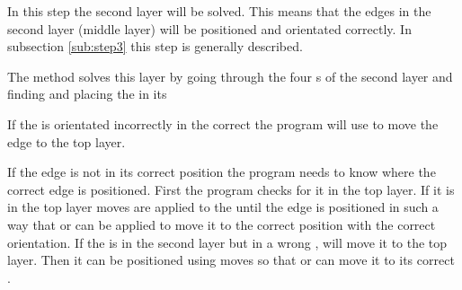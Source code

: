 In this step the second layer will be solved. 
This means that the edges in the second layer (middle layer) will be positioned and orientated correctly. 
In subsection \ref{sub:step3} this step is generally described. 

The method solves this layer by going through the four \cubicle{}s of the second layer and finding and placing the \cpiece{} in its \cubicle{}

If the \cpiece{} is orientated incorrectly in the correct \cubicle{} the program will use   to move the edge \cpiece{} to the top layer.

If the edge \cpiece{} is not in its correct position the program needs to know where the correct edge \cpiece{} is positioned. First the program checks for it in the top layer. 
If it is in the top layer  moves are applied to the \rubik{} until the edge \cpiece{} is positioned in such a way that  or  can be applied to move it to the correct position with the correct orientation. 
If the \cpiece{} is in the second layer but in a wrong \cubicle{},  will move it to the top layer. 
Then it can be positioned using  moves so that  or  can move it to its correct \cubicle{}.